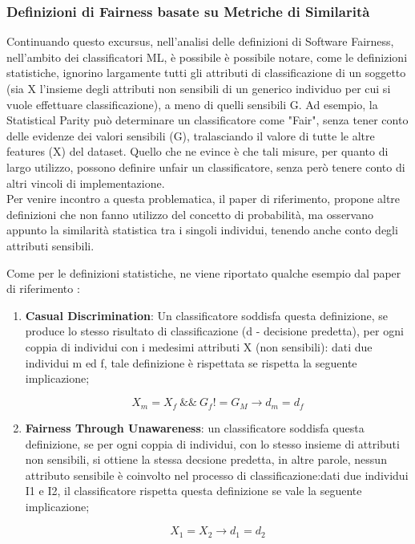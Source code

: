  \subsubsection{Definizioni di Fairness basate su Metriche di Similarità}
 
 Continuando questo excursus, nell'analisi delle definizioni di Software Fairness, nell'ambito dei classificatori ML, è possibile è possibile notare, come le definizioni statistiche, ignorino largamente tutti gli attributi di classificazione di un soggetto (sia X l'insieme degli attributi non sensibili di un generico individuo per cui si vuole effettuare classificazione), a meno di quelli sensibili G. Ad esempio, la Statistical Parity può determinare un classificatore come "Fair", senza tener conto delle evidenze dei valori sensibili (G), tralasciando il valore di tutte le altre features (X) del dataset. Quello che ne evince è che tali misure, per quanto di largo utilizzo, possono definire unfair un classificatore, senza però tenere conto di altri vincoli di implementazione\cite{FairnessDefinitionExplained}. \\
 Per venire incontro a questa problematica, il paper di riferimento, propone altre definizioni che non fanno utilizzo del concetto di probabilità, ma osservano appunto la similarità statistica tra i singoli individui, tenendo anche conto degli attributi sensibili.
 
 Come per le definizioni statistiche, ne viene riportato qualche esempio dal paper di riferimento \cite{FairnessDefinitionExplained}:
 
 \begin{enumerate}
     \item \textbf{Casual Discrimination}: Un classificatore soddisfa questa definizione, se produce lo stesso risultato di classificazione (d - decisione predetta), per ogni coppia di individui con i medesimi attributi X (non sensibili): dati due individui m ed f, tale definizione è rispettata se rispetta la seguente implicazione;  
     
     
     \begin{equation*}
    X_m = X_f \ \&\& \ G_f != G_M \xrightarrow{} d_m = d_f
    \end{equation*} 

     \item \textbf{Fairness Through Unawareness}: un classificatore soddisfa questa definizione, se per ogni coppia di individui, con lo stesso insieme di attributi non sensibili, si ottiene la stessa decsione predetta, in altre parole, nessun attributo sensibile è coinvolto nel processo di classificazione:dati due individui I1 e I2, il classificatore rispetta questa definizione se vale la seguente implicazione;  
     
         
     \begin{equation*}
        X_1 = X_2 \xrightarrow{} d_1 = d_2
    \end{equation*} 
 \end{enumerate}
 
